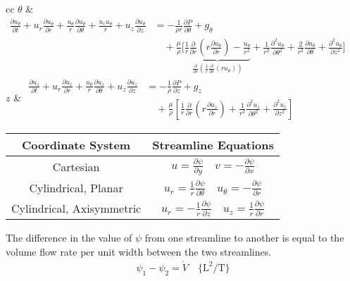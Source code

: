 \begin{table}[h]
\begin{tabular}{cc}
        $\theta$ & \(\displaystyle \begin{aligned} \frac{\partial u_{\theta}}{\partial t} + u_r \frac{\partial u_{\theta}}{\partial r} + \frac{u_{\theta}}{r} \frac{\partial u_{\theta}}{\partial \theta} + \frac{u_r u_{\theta}}{r} + u_z \frac{\partial u_{\theta}}{\partial z} &= -\frac{1}{\rho r} \frac{\partial P}{\partial \theta} + g_{\theta} \\ &\quad + \frac{\mu}{\rho} \biggr[\underbrace{\frac{1}{r} \frac{\partial}{\partial r}\left(r \frac{\partial u_{\theta}}{\partial r}\right) - \frac{u_{\theta}}{r^2}}_{\displaystyle \frac{\partial}{\partial r}\left(\frac{1}{r}\frac{\partial}{\partial r}(r u_{\theta})\right)} + \frac{1}{r^2} \frac{\partial^2 u_{\theta}}{\partial \theta^2} + \frac{2}{r^2} \frac{\partial u_{\theta}}{\partial \theta} + \frac{\partial^2 u_{\theta}}{\partial z^2}\biggr] \end{aligned}\) \\[9ex]
        $z$ & \(\displaystyle \begin{aligned} \frac{\partial u_z}{\partial t} + u_r \frac{\partial u_z}{\partial r} + \frac{u_{\theta}}{r} \frac{\partial u_z}{\partial \theta} + u_z \frac{\partial u_z}{\partial z} &= -\frac{1}{\rho} \frac{\partial P}{\partial z} + g_z \\ &\quad + \frac{\mu}{\rho} \left[\frac{1}{r} \frac{\partial}{\partial r}\left(r \frac{\partial u_z}{\partial r}\right) + \frac{1}{r^2} \frac{\partial^2 u_z}{\partial \theta^2} + \frac{\partial^2 u_z}{\partial z^2}\right] \end{aligned}\) \\[7ex]
        \bottomrule
    \end{tabular}
\end{table}

\begin{table}[H]
    \centering
    \begin{tabular}{cc}
        \toprule
        Coordinate System & Streamline Equations \\
        \midrule
        Cartesian & \(\displaystyle u = \frac{\partial \psi}{\partial y} \quad v = -\frac{\partial \psi}{\partial x}\) \\
        Cylindrical, Planar & \(\displaystyle u_r = \frac{1}{r} \frac{\partial \psi}{\partial \theta} \quad u_{\theta} = -\frac{\partial \psi}{\partial r}\) \\[2ex]
        Cylindrical, Axisymmetric & \(\displaystyle u_r = - \frac{1}{r} \frac{\partial \psi}{\partial z} \quad u_z = \frac{1}{r} \frac{\partial \psi}{\partial r}\) \\
        \bottomrule
    \end{tabular}
\end{table}
The difference in the value of $\psi$ from one streamline to another is equal to the volume flow rate per unit width between the two streamlines.
\begin{align*}
    \psi_1 - \psi_2 = \dot{V}\quad \{\text{L}^2/\text{T}\}
\end{align*}


